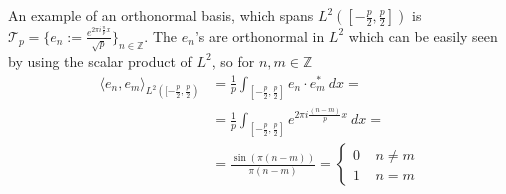 \documentclass[a4paper]{article}
\begin{document}
An example of an orthonormal basis, which spans $L^2([-\frac{p}{2},
\frac{p}{2}])$ is $\mathcal{T}_p = \{e_n := \frac{e^{2\pi i
\frac{n}{p}x}}{\sqrt{p}}\}_{n\in\mathbb{Z}}$. The $e_n$'s are orthonormal in
$L^2$ which can be easily seen by using the scalar product of $L^2$, so for
$n, m \in \mathbb{Z}$
\begin{align}
    \langle e_n, e_m\rangle_{L^2([-\frac{p}{2}, \frac{p}{2})} &=
    \frac{1}{p}\int_{[-\frac{p}{2}, \frac{p}{2}]}e_n \cdot e_m^* \ dx=\\
    &=\frac{1}{p}\int_{[-\frac{p}{2}, \frac{p}{2}]} e^{2\pi i \frac{(n-m)}{p} x} \ dx=\\
    &=\frac{\sin(\pi (n-m))}{\pi(n-m)} =
    \begin{cases}
        0  \;\;\;\; n\neq m\\
        1 \;\;\;\;  n=m
    \end{cases}
\end{align}
\end{document}
